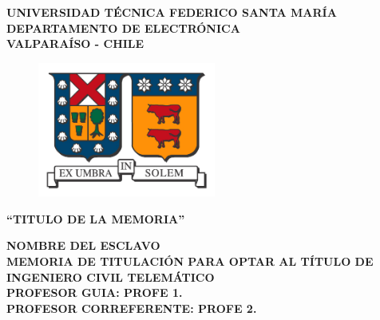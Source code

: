 \documentclass[12pt,spanish,twoside]{thesis}
\begin{document}
\thispagestyle{empty}

\begin{center}
\linespread{1.15}
\textbf{\large{UNIVERSIDAD TÉCNICA FEDERICO SANTA MARÍA\\}
\normalsize{DEPARTAMENTO DE ELECTRÓNICA\\VALPARAÍSO - CHILE\\}}

\vspace{0.5cm}
\begin{figure}[H]
\centering
  \includegraphics[width=5.85cm]{usmLogo}
\end{figure}
\vspace{0.5cm}

\linespread{1}\hangindent=0cm
\textbf{\Large ``TITULO DE LA MEMORIA''\\}
\vspace{3cm}

\hangindent=0cm\large \textbf{NOMBRE DEL ESCLAVO}\\
\vspace{0.5cm}
\hangindent=0cm\normalsize \textbf{MEMORIA DE TITULACIÓN PARA OPTAR AL TÍTULO DE INGENIERO CIVIL TELEMÁTICO}\\
\vspace{1cm}
\hangindent=0cm\normalsize \textbf{PROFESOR GUIA: \hspace{2cm} PROFE 1.}\\
\vspace{0.5cm}
\hangindent=0cm\normalsize \textbf{PROFESOR CORREFERENTE: \hspace{2cm} PROFE 2.}\\

\end{center}
\thispagestyle{empty}

\newpage 
\thispagestyle{empty}

\renewcommand\headrulewidth{0pt}


\frontmatter
\pagestyle{fancy}

\end{document}
